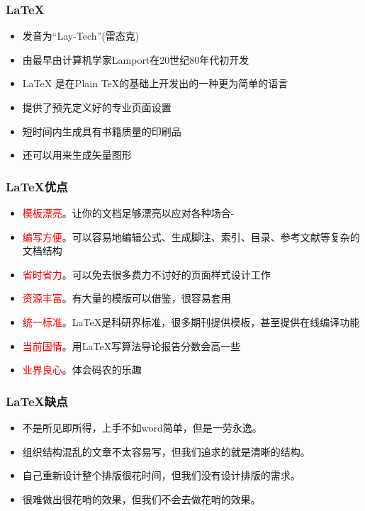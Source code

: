 \begin{frame}\frametitle{\LaTeX{}}
    \begin{itemize}
         \item 发音为“Lay-Tech”(雷态克)
         \item 由最早由计算机学家Lamport在20世纪80年代初开发
         \item \LaTeX{} 是在Plain \TeX{}的基础上开发出的一种更为简单的语言
         \item 提供了预先定义好的专业页面设置
         \item 短时间内生成具有书籍质量的印刷品
         \item 还可以用来生成矢量图形
    \end{itemize}
\end{frame}

\begin{frame}\frametitle{\LaTeX{}优点}
    \begin{itemize}
        \item<1-> \textcolor{red}{模板漂亮}。让你的文档足够漂亮以应对各种场合-
        \item<2-> \textcolor{red}{编写方便}。可以容易地编辑公式、生成脚注、索引、目录、参考文献等复杂的文档结构
        \item<3-> \textcolor{red}{省时省力}。可以免去很多费力不讨好的页面样式设计工作
        \item<4-> \textcolor{red}{资源丰富}。有大量的模版可以借鉴，很容易套用
        \item<5-> \textcolor{red}{统一标准}。\LaTeX{}是科研界标准，很多期刊提供模板，甚至提供在线编译功能
        \item<6-> \textcolor{red}{当前国情}。用\LaTeX{}写算法导论报告分数会高一些
        \item<7-> \textcolor{red}{业界良心}。体会码农的乐趣
    \end{itemize}
\end{frame}

\begin{frame}\frametitle{\LaTeX{}缺点}
    \begin{itemize}
         \item 不是所见即所得，上手不如word简单，但是一劳永逸。
         \item 组织结构混乱的文章不太容易写，但我们追求的就是清晰的结构。
         \item 自己重新设计整个排版很花时间，但我们没有设计排版的需求。
         \item 很难做出很花哨的效果，但我们不会去做花哨的效果。
    \end{itemize}
\end{frame}

